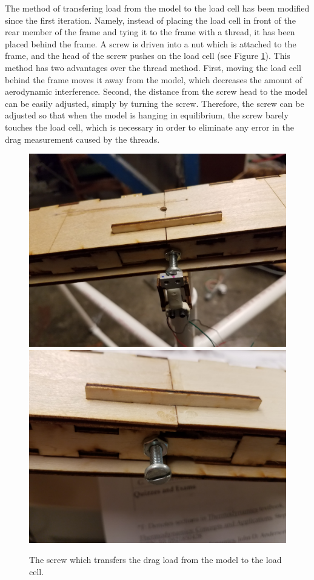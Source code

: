 \documentclass[12pt]{report} %
\begin{document}
The method of transfering load from the model to the load cell has been modified since the first iteration. Namely, instead
of placing the load cell in front of the rear member of the frame and tying it to the frame with a thread, it has been placed
behind the frame. A screw is driven into a nut which is attached to the frame, and the head of the screw pushes on the load
cell (see Figure \ref{load_transfer_screw}). This method has two advantages over the thread method. First, moving the load
cell behind the frame moves it away from the
model, which decreases the amount of aerodynamic interference. Second, the distance from the screw head to the model can be
easily adjusted, simply by turning the screw. Therefore, the screw can be adjusted so that when the model is hanging in equilibrium,
the screw barely touches the load cell, which is necessary in order to eliminate any error in the drag measurement caused by the
threads.

\begin{figure}
\includegraphics[width = 0.49\linewidth]{load_transfer_screw.jpg}
\includegraphics[angle=180,origin=c,width = 0.49\linewidth]{screw.jpg}
\centering
\caption{The screw which transfers the drag load from the model to the load cell.}
\label{load_transfer_screw}
\end{figure}
\end{document}
